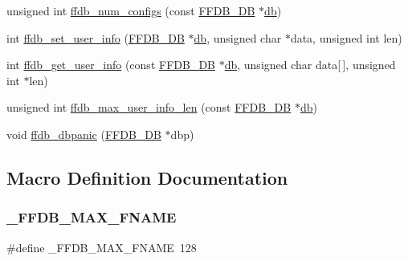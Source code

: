 \begin{DoxyCompactItemize}
\item 
unsigned int \mbox{\hyperlink{adat-devel_2other__libs_2filedb_2filehash_2ffdb__db_8h_aa3722865ae0e52878e2fc443f4f1a0a8}{ffdb\+\_\+num\+\_\+configs}} (const \mbox{\hyperlink{adat-devel_2other__libs_2filedb_2filehash_2ffdb__db_8h_a0b27b956926453a7a8141ea8e10f0df8}{F\+F\+D\+B\+\_\+\+DB}} $\ast$\mbox{\hyperlink{structdb}{db}})
\item 
int \mbox{\hyperlink{adat-devel_2other__libs_2filedb_2filehash_2ffdb__db_8h_aa9be22f501b0567050accbc8c9026c11}{ffdb\+\_\+set\+\_\+user\+\_\+info}} (\mbox{\hyperlink{adat-devel_2other__libs_2filedb_2filehash_2ffdb__db_8h_a0b27b956926453a7a8141ea8e10f0df8}{F\+F\+D\+B\+\_\+\+DB}} $\ast$\mbox{\hyperlink{structdb}{db}}, unsigned char $\ast$data, unsigned int len)
\item 
int \mbox{\hyperlink{adat-devel_2other__libs_2filedb_2filehash_2ffdb__db_8h_a92fefe6ca23ce778c0d595a7d93a3689}{ffdb\+\_\+get\+\_\+user\+\_\+info}} (const \mbox{\hyperlink{adat-devel_2other__libs_2filedb_2filehash_2ffdb__db_8h_a0b27b956926453a7a8141ea8e10f0df8}{F\+F\+D\+B\+\_\+\+DB}} $\ast$\mbox{\hyperlink{structdb}{db}}, unsigned char data\mbox{[}$\,$\mbox{]}, unsigned int $\ast$len)
\item 
unsigned int \mbox{\hyperlink{adat-devel_2other__libs_2filedb_2filehash_2ffdb__db_8h_ae8a9ae9edc3fe45e5e342d0fabcc56e9}{ffdb\+\_\+max\+\_\+user\+\_\+info\+\_\+len}} (const \mbox{\hyperlink{adat-devel_2other__libs_2filedb_2filehash_2ffdb__db_8h_a0b27b956926453a7a8141ea8e10f0df8}{F\+F\+D\+B\+\_\+\+DB}} $\ast$\mbox{\hyperlink{structdb}{db}})
\item 
void \mbox{\hyperlink{adat-devel_2other__libs_2filedb_2filehash_2ffdb__db_8h_a1ec8fa0dcde4004262934cdb85099527}{ffdb\+\_\+dbpanic}} (\mbox{\hyperlink{adat-devel_2other__libs_2filedb_2filehash_2ffdb__db_8h_a0b27b956926453a7a8141ea8e10f0df8}{F\+F\+D\+B\+\_\+\+DB}} $\ast$dbp)
\end{DoxyCompactItemize}


\subsection{Macro Definition Documentation}
\mbox{\label{adat-devel_2other__libs_2filedb_2filehash_2ffdb__db_8h_a00ab19cd96ae7c01686ceec249b62522}} 
\subsubsection{\texorpdfstring{\_FFDB\_MAX\_FNAME}{\_FFDB\_MAX\_FNAME}}
{\footnotesize\ttfamily \#define \+\_\+\+F\+F\+D\+B\+\_\+\+M\+A\+X\+\_\+\+F\+N\+A\+ME~128}

